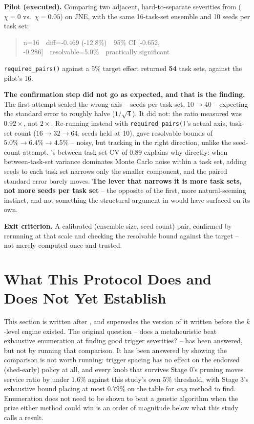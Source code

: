 \textbf{Pilot (executed).} Comparing two adjacent, hard-to-separate severities
from  ($\chi = 0$ vs.\ $\chi = 0.05$) on JNE, with the same
16-task-set ensemble and 10 seeds per task set:

\begin{quote}
\ttfamily
n=16\ \ diff=-0.469 (-12.8\%)\ \ 95\% CI [-0.652, -0.286]\ \ resolvable=5.0\%\ \ practically significant
\end{quote}

\texttt{required\_pairs()} against a 5\% target effect returned \textbf{54}
task sets, against the pilot's 16.

\textbf{The confirmation step did not go as expected, and that is the
finding.} The first attempt scaled the wrong axis -- seeds per task set,
$10 \to 40$ -- expecting the standard error to roughly halve
($1/\sqrt{4}$). It did not: the ratio measured was $0.92\times$, not
$2\times$. Re-running instead with \texttt{required\_pairs()}'s actual axis,
task-set count ($16 \to 32 \to 64$, seeds held at 10), gave resolvable bounds
of $5.0\% \to 6.4\% \to 4.5\%$ -- noisy, but tracking in the right direction,
unlike the seed-count attempt. 's between-task-set
CV of 0.89 explains why directly: when between-task-set variance dominates
Monte Carlo noise within a task set, adding seeds to each task set narrows
only the smaller component, and the paired standard error barely moves.
\textbf{The lever that narrows it is more task sets, not more seeds per task
set} -- the opposite of the first, more natural-seeming instinct, and not
something the structural argument in  would have
surfaced on its own.

\textbf{Exit criterion.} A calibrated (ensemble size, seed count) pair,
confirmed by rerunning at that scale and checking the resolvable bound
against the target -- not merely computed once and trusted.

\section{What This Protocol Does and Does Not Yet Establish}
\label{sec:final-status}

This section is written after , and supersedes the
version of it written before the $k$-level engine existed. The original
question -- does a metaheuristic beat exhaustive enumeration at finding good
trigger severities? -- has been answered, but not by running that comparison.
It has been answered by showing the comparison is not worth running: trigger
spacing has no effect on the endorsed (shed-early) policy at all, and every
knob that survives Stage 0's pruning moves service ratio by under $1.6\%$
against this study's own $5\%$ threshold, with Stage 3's exhaustive bound
placing at most $0.79\%$ on the table for \emph{any} method to find. Enumeration
does not need to be shown to beat a genetic algorithm when the prize either
method could win is an order of magnitude below what this study calls a
result.

